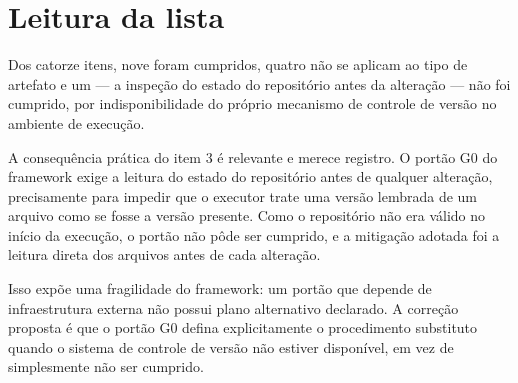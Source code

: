 \section{Leitura da lista}
\label{ap:checklist-leitura}

Dos catorze itens, nove foram cumpridos, quatro não se aplicam ao tipo de artefato
e um --- a inspeção do estado do repositório antes da alteração --- não foi
cumprido, por indisponibilidade do próprio mecanismo de controle de versão no
ambiente de execução.

A consequência prática do item 3 é relevante e merece registro. O portão G0 do
framework exige a leitura do estado do repositório antes de qualquer alteração,
precisamente para impedir que o executor trate uma versão lembrada de um arquivo
como se fosse a versão presente. Como o repositório não era válido no início da
execução, o portão não pôde ser cumprido, e a mitigação adotada foi a leitura
direta dos arquivos antes de cada alteração.

Isso expõe uma fragilidade do framework: um portão que depende de infraestrutura
externa não possui plano alternativo declarado. A correção proposta é que o portão
G0 defina explicitamente o procedimento substituto quando o sistema de controle de
versão não estiver disponível, em vez de simplesmente não ser cumprido.
